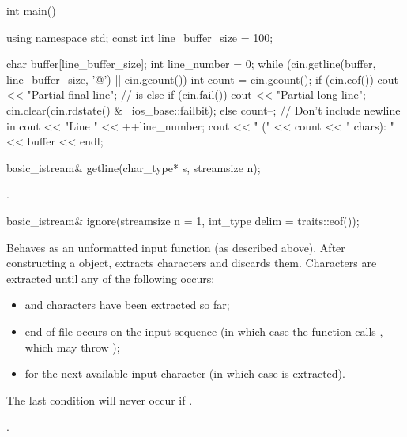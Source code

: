 \begin{itemdescr}
\begin{example}
\begin{codeblock}
int main() {
  using namespace std;
  const int line_buffer_size = 100;

  char buffer[line_buffer_size];
  int line_number = 0;
  while (cin.getline(buffer, line_buffer_size, '@\textbackslash@n') || cin.gcount()) {
    int count = cin.gcount();
    if (cin.eof())
      cout << "Partial final line";     //  is 
    else if (cin.fail()) {
      cout << "Partial long line";
      cin.clear(cin.rdstate() & ~ios_base::failbit);
    } else {
      count--;                          // Don't include newline in 
      cout << "Line " << ++line_number;
    }
    cout << " (" << count << " chars): " << buffer << endl;
  }
}
\end{codeblock}
\end{example}
\end{itemdescr}

%
\begin{itemdecl}
basic_istream& getline(char_type* s, streamsize n);
\end{itemdecl}

\begin{itemdescr}
\pnum
\returns
{}.
\end{itemdescr}

%
\begin{itemdecl}
basic_istream& ignore(streamsize n = 1, int_type delim = traits::eof());
\end{itemdecl}

\begin{itemdescr}
\pnum
\effects
Behaves as an unformatted input function
(as described above).
After constructing a  object, extracts
characters and discards them.
Characters are extracted until any of the following occurs:
\begin{itemize}
\item
{}
and
 characters have been extracted so far;
\item
end-of-file occurs on the input sequence
(in which case the function calls
,
which may throw
);
\item
{}
for the next available input character 
(in which case  is extracted).
\end{itemize}
\begin{note}
The last condition will never occur if
.
\end{note}

\pnum
\returns
{}.
\end{itemdescr}


